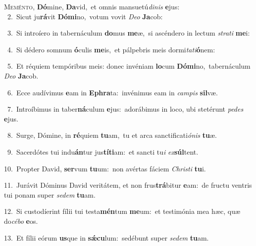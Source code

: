 \lettrine{\initial\textcolor{\initialcolor}{M}}{eménto,} \textbf{Dó}\-mine, \textbf{Da}\-vid,~\star et omnis mansuetú\-\textit{di}\-\textit{nis} \textbf{e}\-jus:\\
{\numbfont\textcolor{\numbcolor}{~2.}}~Sicut ju\-\textbf{rá}\-vit \textbf{Dó}\-\textbf{mi}no,~\star votum vovit \textit{De}\-\textit{o} \textbf{Ja}\-cob:\par
{\numbfont\textcolor{\numbcolor}{~3.}}~Si introíero in tabernáculum \textbf{do}\-mus \textbf{me}\-æ,~\star si ascéndero in lectum \textit{stra}\-\textit{ti} \textbf{me}\-i:\par
{\numbfont\textcolor{\numbcolor}{~4.}}~Si dédero somnum \textbf{ó}\-culis \textbf{me}\-is,~\star et pálpebris meis dormi\-\textit{ta}\-\textit{ti}\textbf{ó}nem:\par
{\numbfont\textcolor{\numbcolor}{~5.}}~Et réquiem tempóribus meis: donec invéniam \textbf{lo}\-cum \textbf{Dó}\-\textbf{mi}no,~\star tabernáculum \textit{De}\-\textit{o} \textbf{Ja}\-cob.\par
{\numbfont\textcolor{\numbcolor}{~6.}}~Ecce audívimus \textbf{e}\-am in \textbf{E}\-\textbf{phra}ta:~\star invénimus eam in \textit{cam}\-\textit{pis} \textbf{sil}\-væ.\par
{\numbfont\textcolor{\numbcolor}{~7.}}~Introíbimus in taber\-\textbf{ná}\-culum \textbf{e}\-jus:~\star adorábimus in loco, ubi stetérunt \textit{pe}\-\textit{des} \textbf{e}\-jus.\par
{\numbfont\textcolor{\numbcolor}{~8.}}~Surge, Dómine, in \textbf{ré}\-quiem \textbf{tu}\-am,~\star tu et arca sanctificati\-\textit{ó}\-\textit{nis} \textbf{tu}\-æ.\par
{\numbfont\textcolor{\numbcolor}{~9.}}~Sacerdótes tui indu\-\textbf{án}\-tur jus\-\textbf{tí}\-\textbf{ti}am:~\star et sancti tu\textit{i} \textit{ex}\-\textbf{súl}tent.\par
{\numbfont\textcolor{\numbcolor}{10.}}~Propter David, \textbf{ser}\-vum \textbf{tu}\-um:~\star non avértas fáciem \textit{Chris}\-\textit{ti} \textbf{tu}\-i.\par
{\numbfont\textcolor{\numbcolor}{11.}}~Jurávit Dóminus David veritátem, et non frus\-\textbf{trá}\-bitur \textbf{e}\-am:~\star de fructu ventris tui ponam super \textit{se}\-\textit{dem} \textbf{tu}\-am.\par
{\numbfont\textcolor{\numbcolor}{12.}}~Si custodíerint fílii tui testa\-\textbf{mén}\-tum \textbf{me}\-um:~\star et testimónia mea hæc, quæ do\-\textit{cé}\-\textit{bo} \textbf{e}\-os.\par
{\numbfont\textcolor{\numbcolor}{13.}}~Et fílii eórum \textbf{us}\-que in \textbf{sǽ}\-\textbf{cu}lum:~\star sedébunt super \textit{se}\-\textit{dem} \textbf{tu}\-am.\par
